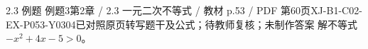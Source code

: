 \par\noindent\begin{minipage}{\linewidth}
\begin{bankitem}{2.3 例题 例题3}{第2章 / 2.3 一元二次不等式 / 教材 p.53 / PDF 第60页}{XJ-B1-C02-EX-P053-Y0304}{已对照原页转写题干及公式；待教师复核；未制作答案}
解不等式 $-x^2+4x-5>0$。
\end{bankitem}
\end{minipage}\par\medskip
